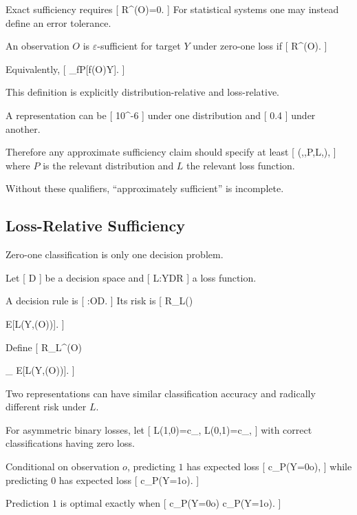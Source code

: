 \documentclass[11pt]{article}
\begin{document}
Exact sufficiency requires
[
R^\star(O)=0.
]
For statistical systems one may instead define an error tolerance.

\begin{definition}
An observation $O$ is $\varepsilon$-sufficient for target $Y$ under zero-one loss if
[
R^\star(O)\leq\varepsilon.
]
\end{definition}

Equivalently,
[
\inf_fP[f(O)\neq Y]\leq\varepsilon.
]

This definition is explicitly distribution-relative and loss-relative.

A representation can be
[
10^{-6}
]
under one distribution and
[
0.4
]
under another.

Therefore any approximate sufficiency claim should specify at least
[
(\pi,\Phi,P,L,\varepsilon),
]
where $P$ is the relevant distribution and $L$ the relevant loss function.

Without these qualifiers, ``approximately sufficient'' is incomplete.

\subsection{Loss-Relative Sufficiency}

Zero-one classification is only one decision problem.

Let
[
\mathcal D
]
be a decision space and
[
L:\mathcal Y\times\mathcal D\to\mathbb R
]
a loss function.

A decision rule is
[
\delta:\mathcal O\to\mathcal D.
]
Its risk is
[
R_L(\delta)

\mathbb E[L(Y,\delta(O))].
]

Define
[
R_L^\star(O)

\inf_\delta
\mathbb E[L(Y,\delta(O))].
]

Two representations can have similar classification accuracy and radically different risk under $L$.

For asymmetric binary losses, let
[
L(1,0)=c_{},
\qquad
L(0,1)=c_{},
]
with correct classifications having zero loss.

Conditional on observation $o$, predicting $1$ has expected loss
[
c_{}P(Y=0\mid o),
]
while predicting $0$ has expected loss
[
c_{}P(Y=1\mid o).
]

Prediction $1$ is optimal exactly when
[
c_{}P(Y=0\mid o)
\leq
c_{}P(Y=1\mid o).
]
\end{document}
